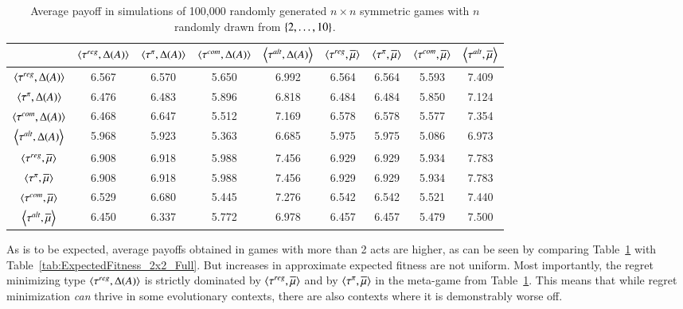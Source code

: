 \documentclass[fleqn,reqno,11pt]{article}
\begin{document}
\begin{table}[]
\centering
\footnotesize
\begin{tabular}{ccccccccc}
  \toprule
 & $\left \langle \tau^{reg}, \Delta(A)\right\rangle$ 
 & $\left \langle \tau^{\pi}, \Delta(A)\right\rangle$ 
 & $\left \langle \tau^{com}, \Delta(A)\right\rangle$
 & $\left \langle \tau^{alt}, \Delta(A)\right\rangle$
 & $\left \langle \tau^{reg}, \overline{\mu}\right\rangle$ 
 & $\left \langle \tau^{\pi}, \overline{\mu}\right\rangle$ 
 & $\left \langle \tau^{com}, \overline{\mu}\right\rangle$
 & $\left \langle \tau^{alt}, \overline{\mu}\right\rangle$ \\ 
  \midrule
  $\left \langle \tau^{reg}, \Delta(A)\right\rangle$ & 6.567 & 6.570 & 5.650 & 6.992 & 6.564 & 6.564 & 5.593 & 7.409 \\
  $\left \langle \tau^{\pi}, \Delta(A)\right\rangle$ & 6.476 & 6.483 & 5.896 & 6.818 & 6.484 & 6.484 & 5.850 & 7.124 \\
  $\left \langle \tau^{com}, \Delta(A)\right\rangle$ & 6.468 & 6.647 & 5.512 & 7.169 & 6.578 & 6.578 & 5.577 & 7.354 \\
  $\left \langle \tau^{alt}, \Delta(A)\right\rangle$ & 5.968 & 5.923 & 5.363 & 6.685 & 5.975 & 5.975 & 5.086 & 6.973 \\
  $\left \langle \tau^{reg}, \overline{\mu}\right\rangle$ & 6.908 & 6.918 & 5.988 & 7.456 & 6.929 & 6.929 & 5.934 & 7.783 \\
  $\left \langle \tau^{\pi}, \overline{\mu}\right\rangle$ & 6.908 & 6.918 & 5.988 & 7.456 & 6.929 & 6.929 & 5.934 & 7.783 \\
  $\left \langle \tau^{com}, \overline{\mu}\right\rangle$ & 6.529 & 6.680 & 5.445 & 7.276 & 6.542 & 6.542 & 5.521 & 7.440 \\
  $\left \langle \tau^{alt}, \overline{\mu}\right\rangle$ & 6.450 & 6.337 & 5.772 & 6.978 & 6.457 & 6.457 & 5.479 & 7.500 \\
   \bottomrule                         
\end{tabular}                      
\caption{Average payoff in simulations of 100,000
  randomly generated $n \times n$ symmetric games with $n$ randomly drawn from $\left\{2, \dots, 10\right\}$.}
\label{tab:ExpectedFitness_10x10}        
\end{table}

As is to be expected, average payoffs obtained in games with more than 2 acts are higher, as
can be seen by comparing Table~\ref{tab:ExpectedFitness_10x10} with
Table~\ref{tab:ExpectedFitness_2x2_Full}. But increases in approximate expected fitness are not
uniform. Most importantly, the regret minimizing type $\left \langle \tau^{reg}, \Delta(A)\right\rangle$ is
strictly dominated by $\left \langle \tau^{reg}, \overline{\mu}\right\rangle$ and by $\left \langle \tau^{\pi}, \overline{\mu}\right\rangle$ in
the meta-game from Table~\ref{tab:ExpectedFitness_10x10}. This means that while regret
minimization \emph{can} thrive in some evolutionary contexts, there are also contexts where it
is demonstrably worse off.
\end{document}
